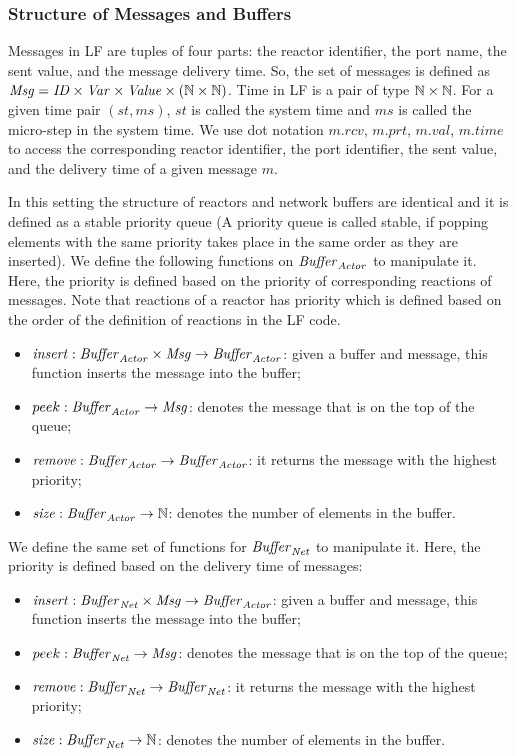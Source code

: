 \subsubsection{Structure of Messages and Buffers}
Messages in LF are tuples of four parts: the reactor identifier, the port name, the sent value, and the message delivery time. So, the set of messages is defined as $\mathit{Msg} = \mathit{ID} \times \mathit{Var} \times \mathit{Value} \times (\mathbb{N} \times \mathbb{N})$. Time in LF is a pair of type $\mathbb{N} \times \mathbb{N}$. For a given time pair $(st,ms)$, $st$ is called the system time and $ms$ is called the micro-step in the system time. We use dot notation $m.rcv$, $m.prt$, $m.val$, $m.time$ to access the corresponding reactor identifier, the port identifier, the sent value, and the delivery time of a given message $m$.

In this setting the structure of reactors and network buffers are identical and it is defined as a stable priority queue (A priority queue is called stable, if popping elements with the same priority takes place in the same order as they are inserted). We define the following functions on $\mathit{Buffer}_{\it Actor}$ to manipulate it. Here, the priority is defined based on the priority of corresponding reactions of messages. Note that reactions of a reactor has priority which is defined based on the order of the definition of reactions in the LF code.
\begin{itemize} 
\item $\mathit{insert}:\mathit{Buffer}_{\it Actor} \times \mathit{Msg}\rightarrow \mathit{Buffer}_{\it Actor}$: given a buffer and message, this function inserts the message into the buffer;
\item $peek:\mathit{Buffer}_{\it Actor} \rightarrow \mathit{Msg}$: denotes the message that is on the top of the queue;
\item $\mathit{remove}:\mathit{Buffer}_{\it Actor} \rightarrow \mathit{Buffer}_{\it Actor} $: it returns the message with the highest priority;
\item $\mathit{size}:\mathit{Buffer}_{\it Actor} \rightarrow \mathbb{N}$: denotes the number of elements in the buffer.
\end{itemize}

We define the same set of functions for $\mathit{Buffer}_{\it Net}$ to manipulate it. Here, the priority is defined based on the delivery time of messages:
\begin{itemize} 
\item $\mathit{insert}:\mathit{Buffer}_{\it Net} \times \mathit{Msg}\rightarrow \mathit{Buffer}_{\it Actor}$: given a buffer and message, this function inserts the message into the buffer;
\item $peek:\mathit{Buffer}_{\it Net} \rightarrow \mathit{Msg}$: denotes the message that is on the top of the queue;
\item $\mathit{remove}:\mathit{Buffer}_{\it Net} \rightarrow \mathit{Buffer}_{\it Net} $: it returns the message with the highest priority;
\item $\mathit{size}:\mathit{Buffer}_{\it Net} \rightarrow \mathbb{N}$: denotes the number of elements in the buffer.
\end{itemize}

